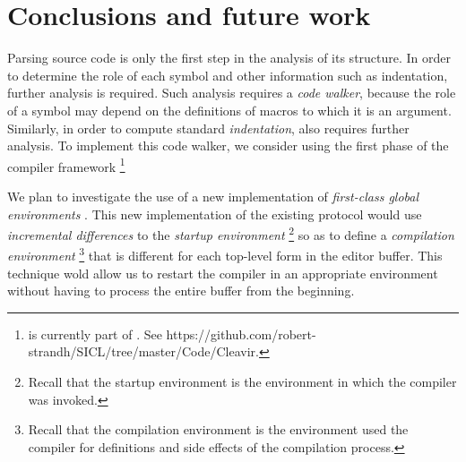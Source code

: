 \section{Conclusions and future work}

Parsing \commonlisp{} source code is only the first step in the
analysis of its structure.  In order to determine the role of each
symbol and other information such as indentation, further analysis is
required.  Such analysis requires a \emph{code walker}, because the
role of a symbol may depend on the definitions of macros to which it
is an argument.  Similarly, in order to compute standard
\emph{indentation}, also requires further analysis.  To implement this
code walker, we consider using the first phase of the \cleavir{}
compiler framework%
\footnote{\cleavir{} is currently part of \sicl{}.  See
  https://github.com/robert-strandh/SICL/tree/master/Code/Cleavir.}

We plan to investigate the use of a new implementation of
\emph{first-class global environments}
\cite{Strandh:2015:ELS:Environments}.  This new implementation of the
existing \clos{} protocol would use \emph{incremental differences} to
the \emph{startup environment}%
\footnote{Recall that the startup environment is the environment in
  which the compiler was invoked.}
so as to define a \emph{compilation environment}%
\footnote{Recall that the compilation environment is the environment
  used the compiler for definitions and side effects of the
  compilation process.}
that is different for each top-level form in the editor buffer.  This
technique wold allow us to restart the compiler in an appropriate
environment without having to process the entire buffer from the
beginning.
